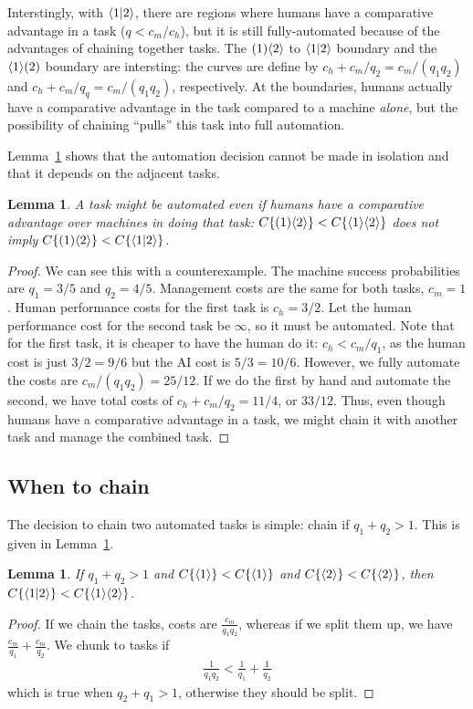 \documentclass{article}
\newtheorem{lemma}[theorem]{Lemma}
\begin{document}
Interstingly, with $\langle 1|2 \rangle$, there are regions where humans have a comparative advantage in a task ($q < c_m/c_h$), but it is still fully-automated because of the advantages of chaining together tasks.
The $( 1 )\langle 2 \rangle$ to $\langle 1|2 \rangle$ boundary and the $\langle 1 \rangle( 2 )$ boundary are intersting:
the curves are define by $c_h + c_m/q_2 = c_m/(q_1q_2)$ and $c_h + c_m/q_q = c_m/(q_1q_2)$, respectively.
At the boundaries, humans actually have a comparative advantage in the task compared to a machine \emph{alone}, but the possibility of chaining ``pulls'' this task into full automation. 

Lemma~\ref{lemma:ce} shows that the automation decision cannot be made in isolation and that it depends on the adjacent tasks.

\begin{lemma} \label{lemma:ce}
A task might be automated even if humans have a comparative advantage over machines in doing that task:
$C\{( 1 )\langle 2 \rangle\} < C\{\langle 1 \rangle\langle 2 \rangle\}$ does not imply $C\{( 1 )\langle 2 \rangle\} < C\{\langle 1|2 \rangle\}$.
\end{lemma}
\begin{proof}
We can see this with a counterexample.
The machine success probabilities are $q_1 = 3/5$ and $q_2 = 4/5$.
Management costs are the same for both tasks, $c_m = 1$.
Human performance costs for the first task is $c_h = 3/2$.
Let the human performance cost for the second task be $\infty$, so it must be automated. 
Note that for the first task, it is cheaper to have the human do it: 
$c_h < c_m / q_1$, as the human cost is just $3/2 = 9/6$ but the AI cost is $5/3 = 10/6$.
However, we fully automate the costs are 
$c_m / (q_1 q_2) = 25/12$. 
If we do the first by hand and automate the second, we have total costs of $c_h + c_m / q_2 = 11/4$, or $33/12$.
Thus, even though humans have a comparative advantage in a task, we might chain it with another task and manage the combined task.
\end{proof}

\subsection{When to chain}
The decision to chain two automated tasks is simple: chain if $q_1 + q_2 > 1$.
This is given in Lemma~\ref{lemma:chain}.

\begin{lemma} \label{lemma:chain}
If $q_1 + q_2 > 1$ and $C\{ \langle 1 \rangle \} < C\{ \langle 1 \rangle \}$ and $C\{ \langle 2 \rangle \} < C\{ \langle 2 \rangle \}$, then $C\{ \langle 1|2 \rangle \} < C\{ \langle 1 \rangle\langle 2 \rangle \}$.  
\end{lemma}
\begin{proof}
If we chain the tasks, costs are $\frac{c_m}{q_1q_2}$, whereas if we split them up, we have $\frac{c_m}{q_1} + \frac{c_m}{q_2}$.
We chunk to tasks if 
\begin{align}
\frac{1}{q_1 q_2} <\frac{1}{q_1} + \frac{1}{q_2}
\end{align}
which is true when $q_2 + q_1 > 1$, otherwise they should be split. 
\end{proof}
\end{document}
